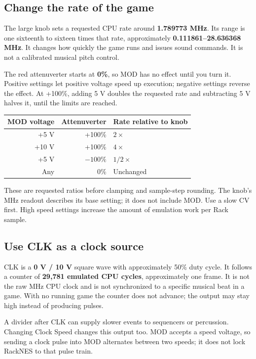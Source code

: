 \subsection{Change the rate of the game}
The large knob sets a requested CPU rate around \textbf{1.789773 MHz}.
Its range is one sixteenth to sixteen times that rate, approximately
\textbf{0.111861--28.636368 MHz}. It changes how quickly the game runs and
issues sound commands. It is not a calibrated musical pitch control.

The red attenuverter starts at \textbf{0\%}, so MOD has no effect until you
turn it. Positive settings let positive voltage speed up execution;
negative settings reverse the effect. At +100\%, adding 5 V doubles the
requested rate and subtracting 5 V halves it, until the limits are reached.

\begin{center}
\begin{tabular}{@{}rrl@{}}
\toprule
\textbf{MOD voltage} & \textbf{Attenuverter} & \textbf{Rate relative to knob} \\
\midrule
+5 V & +100\% & $2\times$ \\
+10 V & +100\% & $4\times$ \\
+5 V & $-100\%$ & $1/2\times$ \\
Any & 0\% & Unchanged \\
\bottomrule
\end{tabular}
\end{center}
These are requested ratios before clamping and sample-step rounding. The
knob's MHz readout describes its base setting; it does not include MOD.
Use a slow CV first. High speed settings increase the amount of emulation
work per Rack sample.

\subsection{Use CLK as a clock source}
CLK is a \textbf{0 V / 10 V} square wave with approximately 50\% duty cycle.
It follows a counter of \textbf{29,781 emulated CPU cycles}, approximately
one frame. It is not the raw MHz CPU clock and is not synchronized to a
specific musical beat in a game. With no running game the counter does not
advance; the output may stay high instead of producing pulses.

A divider after CLK can supply slower events to sequencers or percussion.
Changing Clock Speed changes this output too. MOD accepts a speed voltage,
so sending a clock pulse into MOD alternates between two speeds; it does
not lock RackNES to that pulse train.

